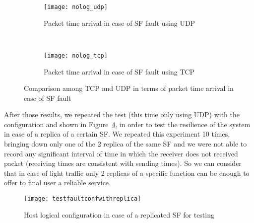 \begin{figure}[]
    \begin{subfigure}[b]{0.9\textwidth}
        \texttt{[image: nolog\_udp]}
        \caption{Packet time arrival in case of SF fault using UDP}
        \label{chap:tests:sec:fault:img:faultgraphudp}
    \end{subfigure}
    \\
    \begin{subfigure}[b]{0.9\textwidth}
        \texttt{[image: nolog\_tcp]}
        \caption{Packet time arrival in case of SF fault using TCP}
        \label{chap:tests:sec:fault:img:faultgraphtcp}
    \end{subfigure}
    \caption{Comparison among TCP and UDP in terms of packet time arrival in
    case of SF fault}
    \label{chap:tests:sec:fault:img:faultgrapht}
\end{figure}

After those results, we repeated the test (this time only using UDP) with the
configuration and shown in
Figure~\ref{chap:tests:sec:fault:img:testfaultconfwithreplica}, in order to
test the resilience of the system in case of a replica of a certain SF. We
repeated this experiment 10 times, bringing down only one of the 2 replica of
the same SF and we were not able to record any significant interval of time in
which the receiver does not received packet (receiving times are consistent
with sending times). So we can consider that in case of light traffic only 2
replicas of a specific function can be enough to offer to final user a reliable
service.

\begin{figure}[H]
  \centering
  \texttt{[image: testfaultconfwithreplica]}
  \caption{Host logical configuration in case of a replicated SF for testing}
  \label{chap:tests:sec:fault:img:testfaultconfwithreplica}
\end{figure}
